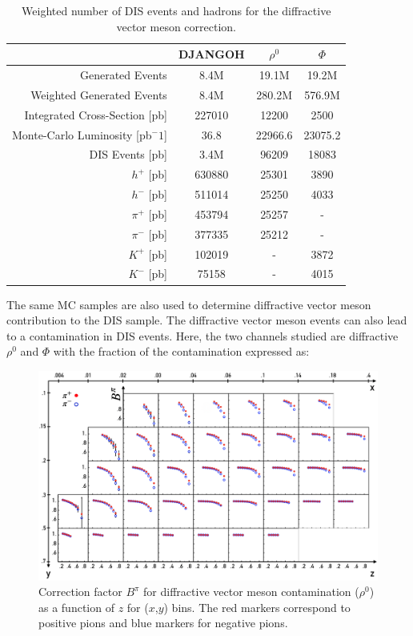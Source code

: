 \begin{table}
	\centering
	\begin{tabular}{rccc}
    \hline
     & DJANGOH & $\rho^0$ & $\Phi$ \\
    \hline
    Generated Events & 8.4M & 19.1M & 19.2M  \\
    Weighted Generated Events & 8.4M & 280.2M & 576.9M  \\
		Integrated Cross-Section [pb] & 227010 & 12200 & 2500  \\
		Monte-Carlo Luminosity [pb$^-1$] & 36.8 & 22966.6 & 23075.2  \\
    \hline
		DIS Events [pb] & 3.4M & 96209 & 18083  \\
		$h^+$ [pb] & 630880 & 25301 & 3890  \\
		$h^-$ [pb] & 511014 & 25250 & 4033  \\
		$\pi^+$ [pb] & 453794 & 25257 & -  \\
		$\pi^-$ [pb] & 377335 & 25212 & -  \\
		$K^+$ [pb] & 102019 & - & 3872  \\
		$K^-$ [pb] & 75158 & - & 4015 \\
  \end{tabular}
  \caption{Weighted number of DIS events and hadrons for the diffractive vector meson correction.}
  \label{DVM}
\end{table}

The same MC samples are also used to determine diffractive vector meson contribution to the DIS sample. The diffractive vector meson events can also lead to a contamination in DIS events. Here, the two channels studied are diffractive $\rho^0$ and $\Phi$ with the fraction of the contamination expressed as:

\begin{figure}
  \centering
	\includegraphics[scale=0.8]{./gfx/DVMpi.png}
	\caption{Correction factor $B^{\pi}$ for diffractive vector meson contamination ($\rho^0$) as a function of $z$ for ($x$,$y$) bins. The red markers correspond to positive pions and blue markers for negative pions.}
	\label{DVMpi}
\end{figure}

